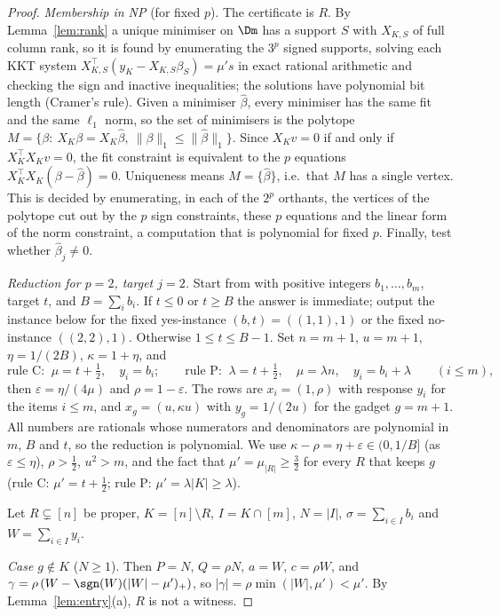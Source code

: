 \begin{proof}
\emph{Membership in NP} (for fixed $p$). The certificate is $R$. By Lemma~\ref{lem:rank} a unique minimiser on $\Dm$ has a support $S$ with $X_{K,S}$ of full column rank, so it is found by enumerating the $3^p$ signed supports, solving each KKT system $X_{K,S}^{\top}(y_K-X_{K,S}\beta_S)=\mu' s$ in exact rational arithmetic and checking the sign and inactive inequalities; the solutions have polynomial bit length (Cramer's rule). Given a minimiser $\hat\beta$, every minimiser has the same fit and the same $\ell_1$ norm, so the set of minimisers is the polytope $M=\{\beta:\ X_K\beta=X_K\hat\beta,\ \lVert\beta\rVert_1\le\lVert\hat\beta\rVert_1\}$. Since $X_Kv=0$ if and only if $X_K^{\top}X_Kv=0$, the fit constraint is equivalent to the $p$ equations $X_K^{\top}X_K(\beta-\hat\beta)=0$. Uniqueness means $M=\{\hat\beta\}$, i.e.\ that $M$ has a single vertex. This is decided by enumerating, in each of the $2^p$ orthants, the vertices of the polytope cut out by the $p$ sign constraints, these $p$ equations and the linear form of the norm constraint, a computation that is polynomial for fixed $p$. Finally, test whether $\hat\beta_j\neq0$.

\emph{Reduction for $p=2$, target $j=2$.} Start from  with positive integers $b_1,\dots,b_m$, target $t$, and $B=\sum_ib_i$. If $t\le0$ or $t\ge B$ the answer is immediate; output the instance below for the fixed yes-instance $(b,t)=((1,1),1)$ or the fixed no-instance $((2,2),1)$. Otherwise $1\le t\le B-1$. Set $n=m+1$, $u=m+1$, $\eta=1/(2B)$, $\kappa=1+\eta$, and
\[
\text{rule C: }\ \mu=t+\tfrac12,\quad y_i=b_i;\qquad
\text{rule P: }\ \lambda=t+\tfrac12,\quad \mu=\lambda n,\quad y_i=b_i+\lambda\qquad(i\le m),
\]
then $\varepsilon=\eta/(4\mu)$ and $\rho=1-\varepsilon$. The rows are $x_i=(1,\rho)$ with response $y_i$ for the items $i\le m$, and $x_g=(u,\kappa u)$ with $y_g=1/(2u)$ for the gadget $g=m+1$. All numbers are rationals whose numerators and denominators are polynomial in $m$, $B$ and $t$, so the reduction is polynomial. We use $\kappa-\rho=\eta+\varepsilon\in(0,1/B]$ (as $\varepsilon\le\eta$), $\rho>\tfrac12$, $u^2>m$, and the fact that $\mu'=\mu_{|R|}\ge\tfrac32$ for every $R$ that keeps $g$ (rule C: $\mu'=t+\frac12$; rule P: $\mu'=\lambda|K|\ge\lambda$).

Let $R\subsetneq[n]$ be proper, $K=[n]\setminus R$, $I=K\cap[m]$, $N=|I|$, $\sigma=\sum_{i\in I}b_i$ and $W=\sum_{i\in I}y_i$.

\emph{Case $g\notin K$} ($N\ge1$). Then $P=N$, $Q=\rho N$, $a=W$, $c=\rho W$, and $\gamma=\rho\,(W-\sgn(W)(|W|-\mu')_+)$, so $|\gamma|=\rho\min(|W|,\mu')<\mu'$. By Lemma~\ref{lem:entry}(a), $R$ is not a witness.


\end{proof}
